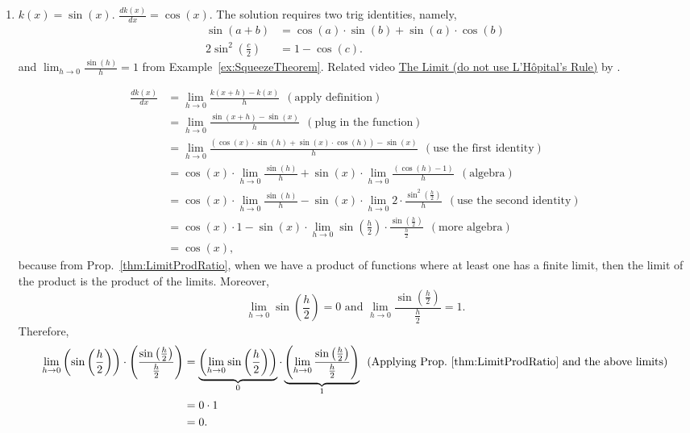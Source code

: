 \begin{enumerate}
    
    \item $k(x) = \sin(x)$. \Ans $\frac{ dk(x) }{d x} =\cos(x)$. The solution requires two trig identities, namely,
\begin{equation}
\begin{aligned}
    \sin(a+b) &= \cos(a) \cdot \sin(b)  + \sin(a) \cdot \cos(b) \\
    2\sin^2\left(\frac{c}{2}\right) &= 1 - \cos(c).
\end{aligned}    
\end{equation}
and $\displaystyle \lim_{h \to 0}  \frac{ \sin(h) }{h} = 1$ from Example~\ref{ex:SqueezeTheorem}. Related video \href{https://youtu.be/mZiPdyHyUvE}{The Limit (do not use L'H\^opital's Rule)} by \bprp.

    
\begin{align*}
    \frac{ dk(x) }{d x} &= \lim_{h \to 0}  \frac{ k(x+h) - k(x)}{h}  ~~(\text{apply definition})\\
    &= \lim_{h \to 0}  \frac{ \sin(x+h) - \sin(x) }{h}  ~~(\text{plug in the function})\\
    &= \lim_{h \to 0}  \frac{ \left(\cos(x) \cdot \sin(h) + \sin(x) \cdot \cos(h) \right)- \sin(x) }{h}  ~~(\text{use the first identity})\\
    &=  \cos(x) \cdot \lim_{h \to 0}  \frac{ \sin(h) }{h} + \sin(x) \cdot \lim_{h \to 0}  \frac{ \left( \cos(h) -1 \right) }{h} ~~(\text{algebra})\\
    &=  \cos(x) \cdot \lim_{h \to 0}  \frac{ \sin(h) }{h} - \sin(x) \cdot \lim_{h \to 0}  2 \cdot \frac{ \sin^2\left( \frac{h}{2} \right) }{h} ~~(\text{use the second identity})\\
     &=  \cos(x) \cdot 1 -  \sin(x) \cdot \lim_{h \to 0} \sin\left( \frac{h}{2} \right) \cdot \frac{ \sin\left( \frac{h}{2} \right)  }{\frac{h}{2} } ~~(\text{more algebra})\\
     & = \cos(x),
\end{align*}
because from Prop.~\ref{thm:LimitProdRatio}, when we have a product of functions where at least one has a finite limit, then the limit of the product is the product of the limits. Moreover,
$$ \lim_{h \to 0}  \sin\left( \frac{h}{2} \right)=0 \text{ and } \lim_{h \to 0} \frac{ \sin\left(\frac{h}{2}\right)  }{\frac{h}{2}} =1.$$
Therefore, 
\begin{align*}
 \lim_{h \to 0} \left( \sin\left( \frac{h}{2} \right) \right) \cdot \left( \frac{ \sin\left( \frac{h}{2} \right)  }{\frac{h}{2}} \right)&= \underbrace{\left(\lim_{h \to 0}  \sin\left( \frac{h}{2} \right) \right)}_{0} \cdot \underbrace{\left( \lim_{h \to 0} \frac{ \sin\left(\frac{h}{2}\right)  }{\frac{h}{2}} \right) }_{1}~~(\text{Applying Prop.~\ref{thm:LimitProdRatio} and the above limits})\\
     & = 0 \cdot 1 \\
     & = 0.
\end{align*}


\end{enumerate}

